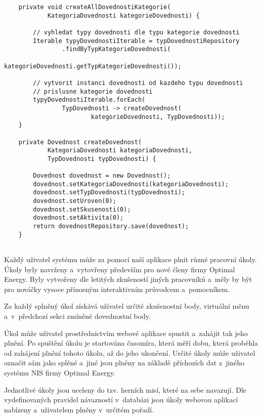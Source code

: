 \documentclass[twoside, 12pt]{article}
\begin{document}
{\begin{lstlisting}
    private void createAllDovednostiKategorie(
            KategoriaDovednosti kategorieDovednosti) {

        // vyhledat typy dovednosti dle typu kategorie dovednosti
        Iterable typyDovednostiIterable = typDovednostiRepository
                .findByTypKategorieDovednosti(
                        kategorieDovednosti.getTypKategorieDovednosti());

        // vytvorit instanci dovednosti od kazdeho typu dovednosti
        // prislusne kategorie dovednosti
        typyDovednostiIterable.forEach(
                TypDovednosti -> createDovednost(
                        kategorieDovednosti, TypDovednosti));
    }

    private Dovednost createDovednost(
            KategoriaDovednosti kategoriaDovednosti,
            TypDovednosti typDovednosti) {

        Dovednost dovednost = new Dovednost();
        dovednost.setKategoriaDovednosti(kategoriaDovednosti);
        dovednost.setTypDovednosti(typDovednosti);
        dovednost.setUroven(0);
        dovednost.setSkusenosti(0);
        dovednost.setAktivita(0);
        return dovednostRepository.save(dovednost);
    }


\end{lstlisting}

\clearpage


Každý uživatel systému může za pomocí naší aplikace plnit různé pracovní úkoly.
Úkoly byly navrženy a~vytovřeny především pro nové členy firmy Optimal Energy.
Byly vytvořeny dle letitých zkušeností jiných pracovníků
a~měly by být pro nováčky vysoce přínosným interaktivním průvodcem a~pomocníkem.

Za každý splněný úkol získává užívatel určité zkušenostní body,
virtuální měnu a~v~předchozí sekci zmíněné dovednostní body.

Úkol může uživatel prostřednictvím webové aplikace spustit a~zahájit tak jeho plnění.
Po spuštění úkolu je startována časomíra, která měří dobu,
která proběhla od zahájení plnění tohoto úkolu, až do jeho ukončení.
Určité úkoly může uživatel označit sám jako splěné
a~jiné jsou plněny na základě příchozích dat z~jiného systému NIS firmy Optimal Energy.

Jednotlivé úkoly jsou uceleny do tzv. herních misí, které na sebe navazují.
Dle vydefinovaných pravidel návazností v~databázi jsou úkoly webovou aplikací nabízeny
a~uživatelem plněny v~určitém pořadí.

}
\end{document}
